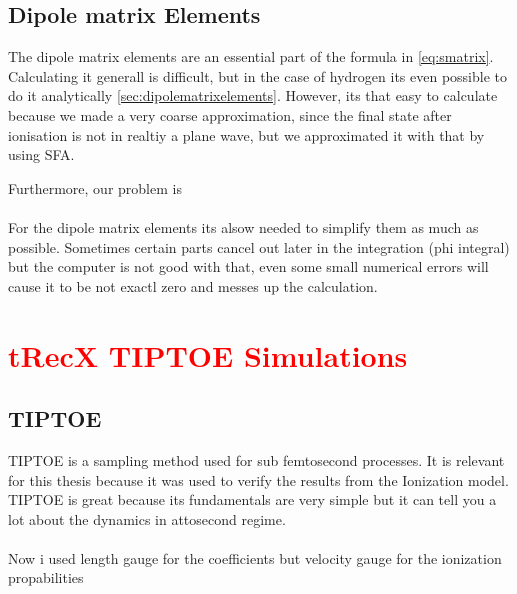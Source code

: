 \subsection{Dipole matrix Elements}
The dipole matrix elements are an essential part of the formula in \eqref{eq:smatrix}. 
Calculating it generall is difficult, but in the case of hydrogen its even possible to do it analytically \ref{sec:dipolematrixelements}.
However, its that easy to calculate because we made a very coarse approximation, since the final state after ionisation is not in realtiy a plane wave, but we approximated it with that by using SFA.

Furthermore, our problem is \\\\

For the dipole matrix elements its alsow needed to simplify them as much as possible. 
Sometimes certain parts cancel out later in the integration (phi integral) but the computer is not good with that, even some small numerical errors will cause it to be not exactl zero and messes up the calculation.




\section{\textcolor{red}{tRecX TIPTOE Simulations}}
\subsection{TIPTOE}
TIPTOE \cite{Park:18} is a sampling method used for sub femtosecond processes. It is relevant for this thesis because it was used to verify the results from the Ionization model. 
TIPTOE is great because its fundamentals are very simple but it can tell you a lot about the dynamics in attosecond regime. \\\\

Now i used length gauge for the coefficients but velocity gauge for the ionization propabilities





